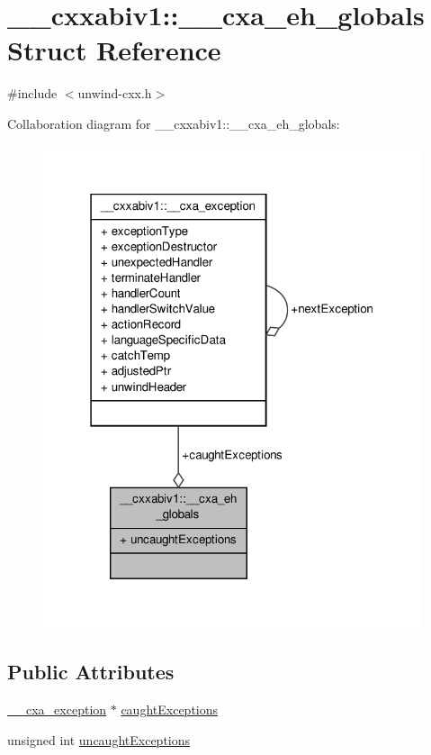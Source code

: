 \hypertarget{struct____cxxabiv1_1_1____cxa__eh__globals}{\section{\-\_\-\-\_\-cxxabiv1\-:\-:\-\_\-\-\_\-cxa\-\_\-eh\-\_\-globals Struct Reference}
\label{struct____cxxabiv1_1_1____cxa__eh__globals}
}


{\ttfamily \#include $<$unwind-\/cxx.\-h$>$}



Collaboration diagram for \-\_\-\-\_\-cxxabiv1\-:\-:\-\_\-\-\_\-cxa\-\_\-eh\-\_\-globals\-:\nopagebreak
\begin{figure}[H]
\begin{center}
\leavevmode
\includegraphics[width=316pt]{struct____cxxabiv1_1_1____cxa__eh__globals__coll__graph}
\end{center}
\end{figure}
\subsection*{Public Attributes}
\begin{DoxyCompactItemize}
\item 
\hyperlink{struct____cxxabiv1_1_1____cxa__exception}{\-\_\-\-\_\-cxa\-\_\-exception} $\ast$ \hyperlink{struct____cxxabiv1_1_1____cxa__eh__globals_a77348d2bb5877643cae07015a2453eb5}{caught\-Exceptions}
\item 
unsigned int \hyperlink{struct____cxxabiv1_1_1____cxa__eh__globals_a59d046223bdff74671ce9fc40d28bfa4}{uncaught\-Exceptions}
\end{DoxyCompactItemize}


